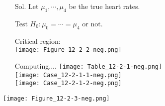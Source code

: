 \begin{frame}

	\begin{enumerate}
		\item[Sol.] Let $\mu_1,\cdots,\mu_4$ be the true heart rates.
			\vfill
		\item[] Test $H_0:\mu_0= \cdots = \mu_4$ or not.
			\vfill
		\item[] Critical region:\\
			\vfill
			\texttt{[image: Figure\_12-2-2-neg.png]}
	\end{enumerate}
\end{frame}
\begin{frame}
\centering
	\begin{enumerate}
		\item[]  Computing....
			\vfill
\texttt{[image: Table\_12-2-1-neg.png]}	\\
\texttt{[image: Case\_12-2-1-1-neg.png]}\\
\texttt{[image: Case\_12-2-1-2-neg.png]}
	\end{enumerate}
\end{frame}
\begin{frame}
	\centering
	\texttt{[image: Figure\_12-2-3-neg.png]}
	\myEnd
\end{frame}
